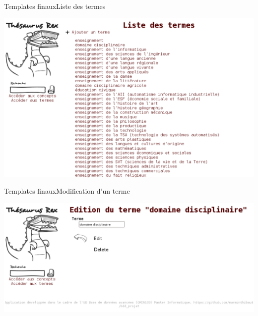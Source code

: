 \begin{frame}{Templates finaux}{Liste des termes}
\begin{center}
\includegraphics[width=\textwidth]{files/screen_termes}
\end{center}
\end{frame}

\begin{frame}{Templates finaux}{Modification d'un terme}
\begin{center}
\includegraphics[width=\textwidth]{files/screen_terme_edit}
\end{center}
\end{frame}